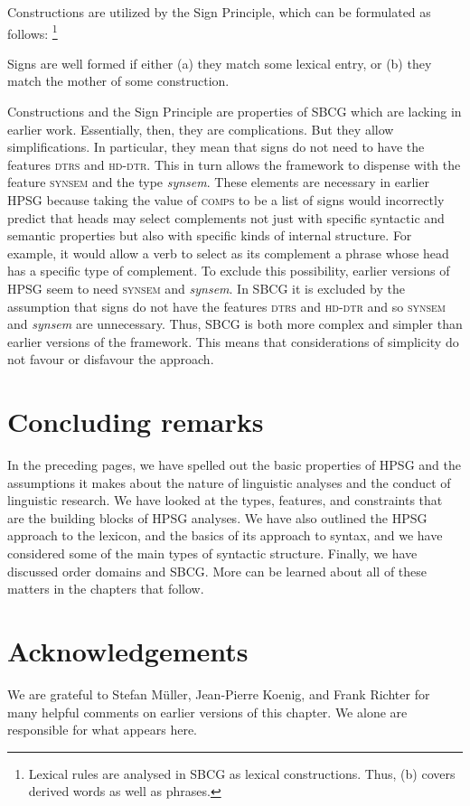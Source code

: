 \documentclass[output=paper
	        ,collection
	        ,collectionchapter
 	        ,biblatex
                ,babelshorthands
                ,newtxmath
                ,draftmode
                ,colorlinks, citecolor=brown
]{langscibook}
\begin{document}
Constructions are utilized by the Sign Principle, which can be formulated as follows:%
%
\footnote{Lexical rules are analysed in SBCG as lexical constructions. Thus, (b) covers derived words as well as phrases.}
%

\ea\label{ex:prop49}
Signs are well formed if either (a) they match some lexical entry, or (b) they match the mother of some construction.
\z

Constructions and the Sign Principle are properties of SBCG which are lacking in earlier work. Essentially, then, they are complications. But they allow simplifications. In particular, they mean that signs do not need to have the features \textsc{dtrs} and \textsc{hd-dtr}. This in turn allows the framework to dispense with the feature \textsc{synsem} and the type \emph{synsem}. These elements are necessary in earlier HPSG because taking the value of \textsc{comps} to be a list of signs would incorrectly predict that heads may select complements not just with specific syntactic and semantic properties but also with specific kinds of internal structure. For example, it would allow a verb to select as its complement a phrase whose head has a specific type of complement. To exclude this possibility, earlier versions of HPSG seem to need \textsc{synsem} and \emph{synsem}. In SBCG it is excluded by the assumption that signs do not have the features \textsc{dtrs} and \textsc{hd-dtr} and so \textsc{synsem} and \emph{synsem} are unnecessary. Thus, SBCG is both more complex and simpler than earlier versions of the framework. This means that considerations of simplicity do not favour or disfavour the approach.

\section{Concluding remarks}

In the preceding pages, we have spelled out the basic properties of HPSG and the assumptions it makes about the nature of linguistic analyses and the conduct of linguistic research. We have looked at the types, features, and constraints that are the building blocks of HPSG analyses. We have also outlined the HPSG approach to the lexicon, and the basics of its approach to syntax, and we have considered some of the main types of syntactic structure. Finally, we have discussed order domains and SBCG. More can be learned about all of these matters in the chapters that follow.


\section*{Acknowledgements}

We are grateful to Stefan Müller, Jean-Pierre Koenig, and Frank Richter for many helpful comments on
earlier versions of this chapter. We alone are responsible for what appears here.



{\sloppy
\printbibliography[heading=subbibliography,notkeyword=this]
}
\end{document}
